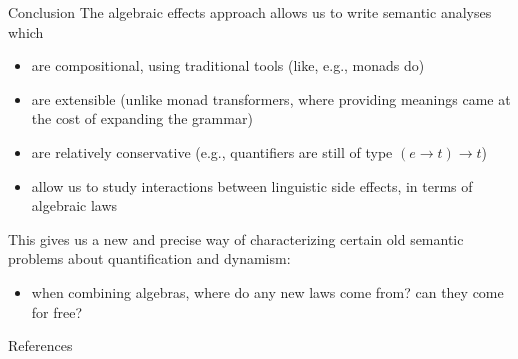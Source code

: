 \documentclass[presentation]{beamer}
\def\ra{\rightarrow}
\begin{document}
\begin{frame}[label={sec:org597f4aa}]{Conclusion}
The algebraic effects approach allows us to write semantic analyses which
\pause
\begin{itemize}[<+->]
\item are compositional, using traditional tools (like, e.g., monads do)
\item are extensible (unlike monad transformers, where providing meanings came at the cost of expanding the grammar)
\item are relatively conservative (e.g., quantifiers are still of type \((e \ra t) \ra t\))
\item allow us to study interactions between linguistic side effects, in terms of algebraic laws
\end{itemize}

\bigskip \pause
This gives us a new and precise way of characterizing certain old semantic problems about quantification and dynamism:
\pause
\begin{itemize}[<+->]
\item when combining algebras, where do any new laws come from? can they come for free?
\end{itemize}
\end{frame}



\begin{frame}[allowframebreaks]{References}

\end{frame}
\end{document}
